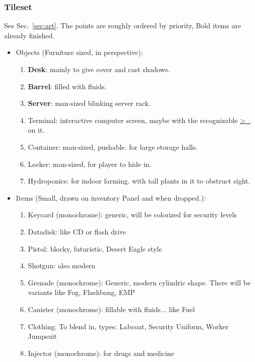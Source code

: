 \documentclass[11pt,a4paper, twocolumn]{article}
\begin{document}
\subsubsection*{Tileset} See Sec.~\ref{sec:art}. The points are roughly ordered by priority,
Bold items are already finished.
        \begin{itemize}
            \item Objects (Furniture sized, in perspective):
                \begin{enumerate}
                    \item \textbf{Desk}: mainly to give cover and cast shadows.
                    \item \textbf{Barrel}: filled with fluids.
                    \item \textbf{Server}: man-sized blinking server rack.
                    \item Terminal: interactive computer screen, maybe with the recognizable \url{ >_ } on it.
                    \item Container: man-sized, pushable. for large storage halls.
                    \item Locker: man-sized, for player to hide in.
                    \item Hydroponics: for indoor farming. with tall plants in it to obstruct sight.
                \end{enumerate}
            \item Items (Small, drawn on inventory Panel and when dropped.):
                \begin{enumerate}
                    \item Keycard (monochrome): generic, will be colorized for security levels
                    \item Datadisk: like CD or flash drive
                    \item Pistol: blocky, futuristic, Desert Eagle style
                    \item Shotgun: also modern
                    \item Grenade (monochrome): Generic, modern cylindric shape. There will be variants like Fog, Flashbang, EMP
                    \item Canister (monochrome): fillable with fluids... like Fuel
                    \item Clothing: To blend in, types: Labcoat, Security Uniform, Worker Jumpsuit
                    \item Injector (monochrome): for drugs and medicine

\end{enumerate}
\end{itemize}
\end{document}
